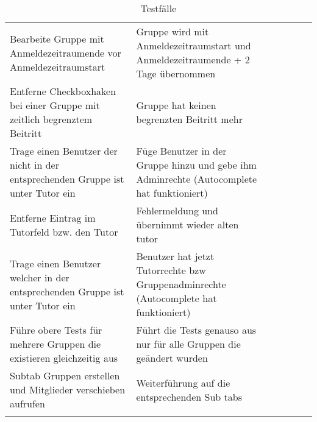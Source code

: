\begin{table}[]
	\centering
	\caption{Testfälle}
	\label{table2}
	\begin{tabular}{p{6cm}p{7cm}p{3cm}llll}
		Bearbeite Gruppe mit Anmeldezeitraumende vor Anmeldezeitraumstart                                                                    & Gruppe wird mit Anmeldezeitraumstart und Anmeldezeitraumende + 2 Tage übernommen                                                                                 & \checkmark            &  &  &  \\
		
		Entferne Checkboxhaken bei einer Gruppe mit zeitlich begrenztem Beitritt                                                             & Gruppe hat keinen begrenzten Beitritt mehr                                                                                                                       & \checkmark           &  &  &  \\
		Trage einen Benutzer der nicht in der entsprechenden Gruppe ist unter Tutor ein                                                      & Füge Benutzer in der Gruppe hinzu und gebe ihm Adminrechte (Autocomplete hat funktioniert)                                                                       & \checkmark           &  &  &  \\
		Entferne Eintrag im Tutorfeld bzw. den Tutor                                                                                         & Fehlermeldung und übernimmt wieder alten tutor                                                                                                                   &             &  &  &  \\
		Trage einen Benutzer welcher in der entsprechenden Gruppe ist unter Tutor ein                                                        & Benutzer hat jetzt Tutorrechte bzw Gruppenadminrechte (Autocomplete hat funktioniert)                                                                            & \checkmark           &  &  &  \\
		Führe obere Tests für mehrere Gruppen die existieren gleichzeitig aus                                                                & Führt die Tests genauso aus nur für alle Gruppen die geändert wurden                                                                                             & \checkmark           &  &  &  \\

		Subtab Gruppen erstellen und Mitglieder verschieben aufrufen                                                                         & Weiterführung auf die entsprechenden Sub tabs                                                                                                                    & \checkmark           &  &  &  \\&                                                                                                                                                                  &             &  &  &  \\
	

\end{tabular}
\end{table}
